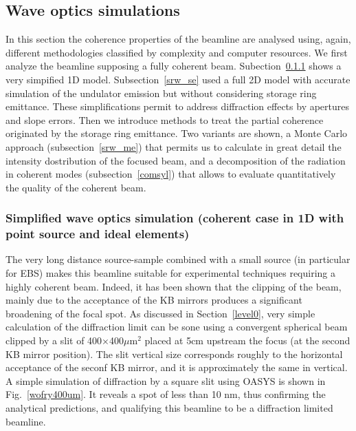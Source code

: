 \documentclass{iucr}              %
\begin{document}
% 

\subsection{Wave optics simulations}
\label{level2}

In this section the coherence properties of the beamline are analysed using, again, different methodologies classified by complexity and computer resources. We first analyze the beamline supposing a fully coherent beam. Subection~\ref{wofry} shows a very simpified 1D model. Subsection~\ref{srw_se} used a full 2D model with accurate simulation of the undulator emission but without considering storage ring emittance. These simplifications permit to address diffraction effects by apertures and slope errors. Then we introduce methods to treat the partial coherence originated by the storage ring emittance. Two variants are shown, a Monte Carlo approach (subsection~\ref{srw_me}) that permits us to calculate in great detail the intensity dostribution of the focused beam, and a decomposition of the radiation in coherent modes (subsection~\ref{comsyl}) that allows to evaluate quantitatively the quality of the coherent beam.  


\subsubsection{Simplified wave optics simulation (coherent case in 1D with point source and ideal elements)}
\label{wofry}

The very long distance source-sample combined with a small source (in particular for EBS) makes this beamline suitable for experimental techniques requiring a highly coherent beam. Indeed, it has been shown that the clipping of the beam, mainly due to the acceptance of the KB mirrors produces a significant broadening of the focal spot.  As discussed in Section~\ref{level0}, very simple calculation of the diffraction limit can be sone using a convergent spherical beam clipped by a slit of 400$\times$400$ \mu$m$^2$ placed at 5cm upstream the focus (at the second KB mirror position). The slit vertical size corresponds roughly to the horizontal acceptance of the seconf KB mirror, and it is approximately the same in vertical. A simple simulation of diffraction by a square slit using OASYS is shown in Fig.~\ref{wofry400um}. It reveals a spot of less than 10 nm, thus confirming the analytical predictions, and qualifying this beamline to be a diffraction limited beamline.  
\end{document}
